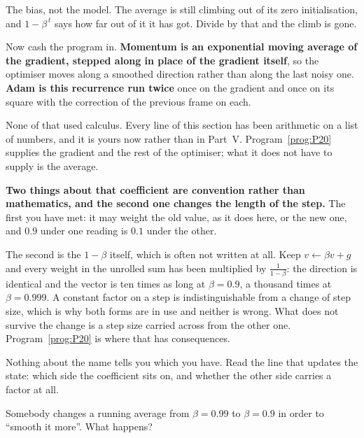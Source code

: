\begin{fr}
\begin{ansblock}
The bias, not the model. The average is still climbing out of its zero
initialisation, and $1 - \beta^{\,t}$ says how far out of it it has got.
Divide by that and the climb is gone.
\end{ansblock}

Now cash the program in. \textbf{Momentum is an exponential moving average of
the gradient, stepped along in place of the gradient itself}, so the optimiser
moves along a smoothed direction rather than along the last noisy one.
\textbf{Adam is this
recurrence run twice} \dash{} once on the gradient and once on its square
\dash{} with the correction of the previous frame on each.

None of that used calculus. Every line of this section has been arithmetic on
a list of numbers, and it is yours now rather than in Part~V.
Program~\ref{prog:P20} supplies the gradient and the rest of the optimiser;
what it does not have to supply is the average.

\begin{warning}
\textbf{Two things about that coefficient are convention rather than
mathematics, and the second one changes the length of the step.} The first you
have met: it may weight the old value, as it does here, or the new one, and
$\num{0.9}$ under one reading is $\num{0.1}$ under the other.

The second is the $1 - \beta$ itself, which is often not written at all.
Keep $v \leftarrow \beta v + g$ and every weight in the unrolled sum has been
multiplied by $\frac{1}{1-\beta}$: the direction is identical and the vector
is ten times as long at $\beta = \num{0.9}$, a thousand times at
$\beta = \num{0.999}$. A constant factor on a step is indistinguishable from
a change of step size, which is why both forms are in use and neither is
wrong. What does not survive the change is a step size carried across from the
other one. Program~\ref{prog:P20} is where that has consequences.

Nothing about the name tells you which you have. Read the line that updates
the state: which side the coefficient sits on, and whether the other side
carries a factor at all.
\end{warning}

Somebody changes a running average from $\beta = \num{0.99}$ to
$\beta = \num{0.9}$ in order to \enquote{smooth it more}. What happens?
\nextframe
\end{fr}

